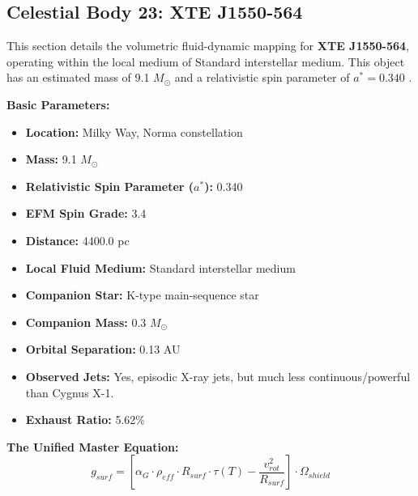 \documentclass[11pt, a4paper]{article}
\begin{document}
\clearpage
\subsection{Celestial Body 23: XTE J1550-564}
This section details the volumetric fluid-dynamic mapping for \textbf{XTE J1550-564}, operating within the local medium of Standard interstellar medium. This object has an estimated mass of 9.1 $M_{\odot}$ and a relativistic spin parameter of $a^* = 0.340$ \cite{orosz2011, simbad}.

\vspace{0.5em}
\noindent \textbf{Basic Parameters:}
\begin{itemize}
  \item \textbf{Location:} Milky Way, Norma constellation
  \item \textbf{Mass:} 9.1 $M_{\odot}$
  \item \textbf{Relativistic Spin Parameter ($a^*$):} 0.340
  \item \textbf{EFM Spin Grade:} 3.4
  \item \textbf{Distance:} 4400.0 pc
  \item \textbf{Local Fluid Medium:} Standard interstellar medium
  \item \textbf{Companion Star:} K-type main-sequence star
  \item \textbf{Companion Mass:} 0.3 $M_{\odot}$
  \item \textbf{Orbital Separation:} 0.13 AU
  \item \textbf{Observed Jets:} Yes, episodic X-ray jets, but much less continuous/powerful than Cygnus X-1.
  \item \textbf{Exhaust Ratio:} 5.62\%
\end{itemize}

\vspace{0.5em}
\noindent \textbf{The Unified Master Equation:}
$$ g_{surf} = \left[ \alpha_G \cdot \rho_{eff} \cdot R_{surf} \cdot \tau(T) - \frac{v_{rot}^2}{R_{surf}} \right] \cdot \Omega_{shield} $$
\end{document}
